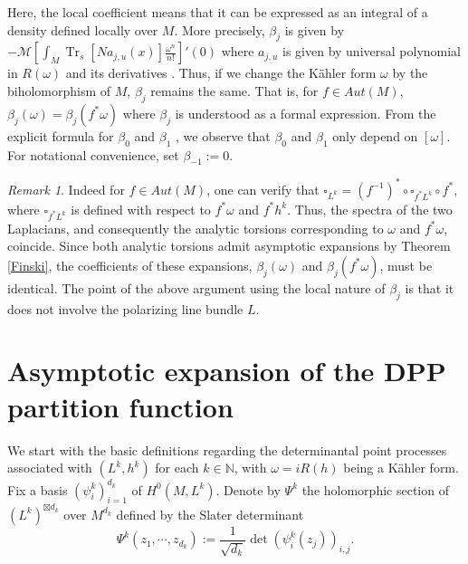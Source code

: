 \documentclass[12pt,reqno,a4paper]{amsart}
\numberwithin{equation}{section}
\def\b{\beta}
\DeclareMathOperator{\Tr}{Tr}
\theoremstyle{remark}
\newtheorem{remark}{Remark}
\theoremstyle{dotless}
\begin{document}
Here, the local coefficient means that it can be expressed as an integral of a density defined locally over $M$. More precisely, $\b_j$ is given by $-\mathcal{M}[\int_M \Tr_s [N{a}_{j,u}(x)]\frac{\omega^n}{n!}]'(0)$ where ${a}_{j,u}$ is given by universal polynomial in $R(\omega)$ and its derivatives \cite[Theorem 1.2, 4.17]{dai2006asymptotic}. Thus, if we change the K\"ahler form $\omega$ by the biholomorphism of $M$, $\b_j$ remains the same. That is, for $f\in Aut(M)$, $\b_j(\omega)=\b_j(f^*\omega)$ where $\b_j$ is understood as a formal expression. From the explicit formula for $\b_0$ \cite[Theorem 8]{vasserot1989asymptotics} and $\b_1$ \cite[Theorem 1.3]{finski2018full}, we observe that $\b_0$ and $\b_1$ only depend on $[\omega]$. For notational convenience, set $\b_{-1}:=0$.

\begin{remark}\label{Finskirmk}
Indeed for $f\in Aut(M)$, one can verify that $\square_{L^k} = (f^{-1})^* \circ\square_{f^* L^k}\circ f^*$, where $\square_{f^* L^k}$ is defined with respect to $f^* \omega$ and $f^* h^k$. Thus, the spectra of the two Laplacians, and consequently the analytic torsions corresponding to $\omega$ and $f^* \omega$, coincide. Since both analytic torsions admit asymptotic expansions by Theorem \ref{Finski}, the coefficients of these expansions, $\b_j(\omega)$ and $\b_j(f^*\omega)$, must be identical. The point of the above argument using the local nature of $\b_j$ is that it does not involve the polarizing line bundle $L$.
\end{remark}

\section{Asymptotic expansion of the DPP partition function}\label{sectiondpp}

We start with the basic definitions regarding the determinantal point processes associated with $(L^k,h^k)$ for each $k\in\mathbb{N}$, with $\omega=iR(h)$ being a K\"ahler form. Fix a basis $(\psi_i^k)_{i=1}^{d_k}$ of $H^0(M,L^k)$. Denote by $\Psi^k$ the holomorphic section of $(L^k)^{\boxtimes d_k}$ over $M^{d_k}$ defined by the Slater determinant
\begin{equation*}
\Psi^k(z_1,\cdots,z_{d_k}):=\frac{1}{\sqrt{d_k}}\det \left(\psi^k_i(z_j)\right)_{i,j}.
\end{equation*}
\end{document}
